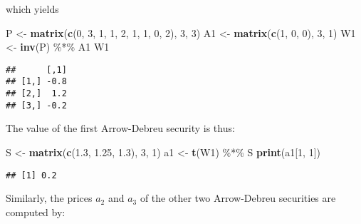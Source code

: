 \documentclass[justified]{tufte-book}
\newenvironment{Shaded}{}{}
\newcommand{\DecValTok}[1]{\textcolor[rgb]{0.25,0.63,0.44}{#1}}
\newcommand{\FloatTok}[1]{\textcolor[rgb]{0.25,0.63,0.44}{#1}}
\newcommand{\KeywordTok}[1]{\textcolor[rgb]{0.00,0.44,0.13}{\textbf{#1}}}
\newcommand{\NormalTok}[1]{#1}
\newcommand{\OperatorTok}[1]{\textcolor[rgb]{0.40,0.40,0.40}{#1}}
\newcommand{\StringTok}[1]{\textcolor[rgb]{0.25,0.44,0.63}{#1}}
\begin{document}
which yields

\begin{Shaded}
\begin{Highlighting}[]
\NormalTok{P \textless{}{-}}\StringTok{ }\KeywordTok{matrix}\NormalTok{(}\KeywordTok{c}\NormalTok{(}\DecValTok{0}\NormalTok{, }\DecValTok{3}\NormalTok{, }\DecValTok{1}\NormalTok{, }\DecValTok{1}\NormalTok{, }\DecValTok{2}\NormalTok{, }\DecValTok{1}\NormalTok{, }\DecValTok{1}\NormalTok{, }\DecValTok{0}\NormalTok{, }\DecValTok{2}\NormalTok{), }\DecValTok{3}\NormalTok{, }\DecValTok{3}\NormalTok{)}
\NormalTok{A1 \textless{}{-}}\StringTok{ }\KeywordTok{matrix}\NormalTok{(}\KeywordTok{c}\NormalTok{(}\DecValTok{1}\NormalTok{, }\DecValTok{0}\NormalTok{, }\DecValTok{0}\NormalTok{), }\DecValTok{3}\NormalTok{, }\DecValTok{1}\NormalTok{)}
\NormalTok{W1 \textless{}{-}}\StringTok{ }\KeywordTok{inv}\NormalTok{(P) }\OperatorTok{\%*\%}\StringTok{ }\NormalTok{A1}
\NormalTok{W1}
\end{Highlighting}
\end{Shaded}

\begin{verbatim}
##      [,1]
## [1,] -0.8
## [2,]  1.2
## [3,] -0.2
\end{verbatim}

The value of the first Arrow-Debreu security is thus:

\begin{Shaded}
\begin{Highlighting}[]
\NormalTok{S \textless{}{-}}\StringTok{ }\KeywordTok{matrix}\NormalTok{(}\KeywordTok{c}\NormalTok{(}\FloatTok{1.3}\NormalTok{, }\FloatTok{1.25}\NormalTok{, }\FloatTok{1.3}\NormalTok{), }\DecValTok{3}\NormalTok{, }\DecValTok{1}\NormalTok{)}
\NormalTok{a1 \textless{}{-}}\StringTok{ }\KeywordTok{t}\NormalTok{(W1) }\OperatorTok{\%*\%}\StringTok{ }\NormalTok{S}
\KeywordTok{print}\NormalTok{(a1[}\DecValTok{1}\NormalTok{, }\DecValTok{1}\NormalTok{])}
\end{Highlighting}
\end{Shaded}

\begin{verbatim}
## [1] 0.2
\end{verbatim}

Similarly, the prices \(a_2\) and \(a_3\) of the other two Arrow-Debreu
securities are computed by:
\end{document}
